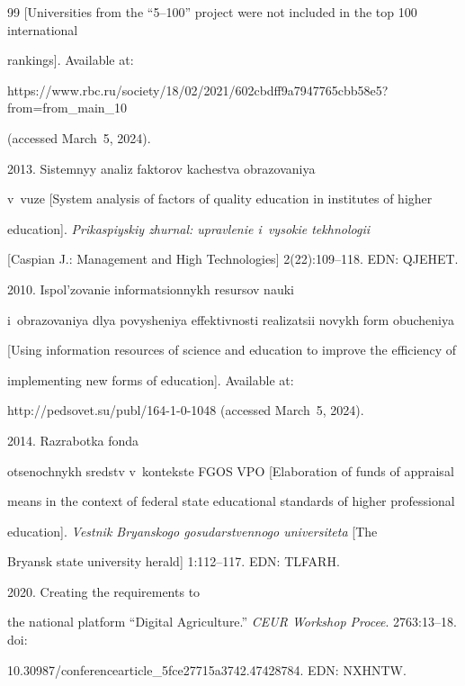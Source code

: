 {{\begin{thebibliography}{99}
[Universities from the ``5--100'' project were not included in the top 100 international 


rankings]. Available at: {\sf 


https://www.rbc.ru/society/18/02/2021/\linebreak 602cbdff9a7947765cbb58e5?from=from\_main\_10} 


(accessed March~5, 2024).




   2013. Sistemnyy analiz faktorov kachestva obrazovaniya 


v~vuze [System analysis of factors of quality education in institutes of higher 


education]. \textit{Prikaspiyskiy zhurnal: upravlenie i~vysokie tekhnologii} 


[Caspian J.: Management and High Technologies] 2(22):109--118. EDN: QJEHET.




   2010. Ispol'zovanie informatsionnykh resursov nauki 


i~obrazovaniya dlya povysheniya effektivnosti realizatsii novykh form obucheniya 


[Using information resources of science and education to improve the efficiency of 


implementing new forms of education]. Available at:  


{\sf http://pedsovet.su/publ/164-1-0-1048} (accessed March~5, 2024).




   2014. Razrabotka fonda 


otsenochnykh sredstv v~kontekste FGOS VPO [Elaboration of funds of appraisal 


means in the context of federal state educational standards of higher professional 


education]. \textit{Vestnik Bryanskogo gosudarstvennogo universiteta} [The 


Bryansk state university herald] 1:112--117. EDN: TLFARH.




   2020. Creating the requirements to 


the national platform ``Digital Agriculture.'' \textit{CEUR Workshop Procee}. 2763:13--18. doi: 


10.30987\!/\!conferencearticle\_5fce27715a3742.47428784. EDN: NXHNTW.


\end{thebibliography}


} }





